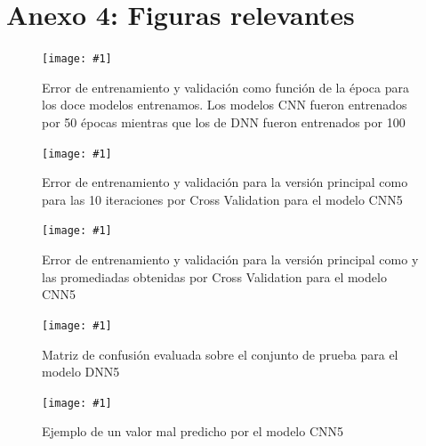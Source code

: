 \documentclass[11pt]{article}
\newcommand{\figura}[3]{\begin{figure}[H] \centering \texttt{[image: \#1]} \caption{#2} \label{#1}  \end{figure}}
\begin{document}
\section*{Anexo 4: Figuras relevantes}
\figura{modelsGrid.pdf}{Error de entrenamiento y validación como función de la época para los doce modelos entrenamos. Los modelos CNN fueron entrenados por 50 épocas mientras que los de DNN fueron entrenados por 100}{width = \textwidth}
\figura{crossValGrid.pdf}{Error de entrenamiento y validación para la versión principal como para las 10 iteraciones por Cross Validation para el modelo CNN5}{width = \textwidth}
\figura{crossValCompar.pdf}{Error de entrenamiento y validación para la versión principal como y las promediadas obtenidas por Cross Validation para el modelo CNN5}{width = \textwidth}
\figura{confussionMatTrain.pdf}{Matriz de confusión evaluada sobre el conjunto de prueba para el modelo DNN5}{width = \textwidth}
\figura{predictionExample.pdf}{Ejemplo de un valor mal predicho por el modelo CNN5}{width = 0.8\textwidth}
\pagebreak
\end{document}
